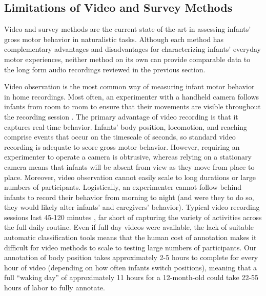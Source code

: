 \documentclass[
  man]{apa6}
\begin{document}
\hypertarget{limitations-of-video-and-survey-methods}{%
\subsection{Limitations of Video and Survey Methods}\label{limitations-of-video-and-survey-methods}}

Video and survey methods are the current state-of-the-art in assessing infants' gross motor behavior in naturalistic tasks. Although each method has complementary advantages and disadvantages for characterizing infants' everyday motor experiences, neither method on its own can provide comparable data to the long form audio recordings reviewed in the previous section.

Video observation is the most common way of measuring infant motor behavior in home recordings. Most often, an experimenter with a handheld camera follows infants from room to room to ensure that their movements are visible throughout the recording session \autocite{Karasik2011,ChenSchneider2022,HerzbergFletcher2021}. The primary advantage of video recording is that it captures real-time behavior. Infants' body position, locomotion, and reaching comprise events that occur on the timescale of seconds, so standard video recording is adequate to score gross motor behavior. However, requiring an experimenter to operate a camera is obtrusive, whereas relying on a stationary camera means that infants will be absent from view as they move from place to place. Moreover, video observation cannot easily scale to long durations or large numbers of participants. Logistically, an experimenter cannot follow behind infants to record their behavior from morning to night (and were they to do so, they would likely alter infants' and caregivers' behavior). Typical video recording sessions last 45-120 minutes \autocite{Karasik2011,ChenSchneider2022,HerzbergFletcher2021}, far short of capturing the variety of activities across the full daily routine. Even if full day videos were available, the lack of suitable automatic classification tools means that the human cost of annotation makes it difficult for video methods to scale to testing large numbers of participants. Our annotation of body position takes approximately 2-5 hours to complete for every hour of video (depending on how often infants switch positions), meaning that a full ``waking day'' of approximately 11 hours for a 12-month-old \autocite{GallandTaylor2012} could take 22-55 hours of labor to fully annotate.
\end{document}
